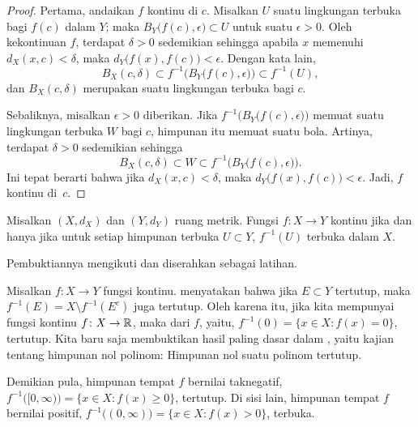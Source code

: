 \begin{proof}
Pertama, andaikan $f$ kontinu di $c$.
Misalkan $U$ suatu lingkungan terbuka bagi $f(c)$
dalam $Y$; maka $B_Y\bigl(f(c),\epsilon\bigr) \subset U$ untuk suatu $\epsilon >
0$.  Oleh kekontinuan $f$, terdapat $\delta > 0$
sedemikian sehingga apabila $x$ memenuhi $d_X(x,c) < \delta$, maka
$d_Y\bigl(f(x),f(c)\bigr) < \epsilon$.  Dengan kata lain,
\begin{equation*}
B_X(c,\delta) \subset f^{-1}\bigl(B_Y\bigl(f(c),\epsilon\bigr)\bigr) \subset
f^{-1}(U) ,
\end{equation*}
dan $B_X(c,\delta)$ merupakan suatu lingkungan terbuka bagi $c$.

Sebaliknya,
misalkan $\epsilon > 0$ diberikan.  Jika
$f^{-1}\bigl(B_Y\bigl(f(c),\epsilon\bigr)\bigr)$ memuat suatu
lingkungan terbuka $W$ bagi $c$, himpunan itu memuat suatu bola.  Artinya, terdapat $\delta > 0$
sedemikian sehingga
\begin{equation*}
B_X(c,\delta) \subset W \subset f^{-1}\bigl(B_Y\bigl(f(c),\epsilon\bigr)\bigr) .
\end{equation*}
Ini tepat berarti bahwa jika $d_X(x,c) < \delta$,
maka $d_Y\bigl(f(x),f(c)\bigr) < \epsilon$.
Jadi, $f$ kontinu di~$c$.
\end{proof}

\begin{thm} \label{thm:mstopocont}
Misalkan $(X,d_X)$ dan $(Y,d_Y)$ ruang metrik.  Fungsi $f \colon X \to Y$
kontinu jika dan hanya jika
untuk setiap himpunan terbuka $U \subset Y$, $f^{-1}(U)$ terbuka dalam $X$.
\end{thm}

Pembuktiannya mengikuti  dan diserahkan sebagai
latihan.

\begin{example}
Misalkan $f \colon X \to Y$ fungsi kontinu.
 menyatakan bahwa jika $E \subset Y$ tertutup, maka 
$f^{-1}(E) = X \setminus f^{-1}(E^c)$ juga tertutup.  Oleh karena itu, jika
kita mempunyai fungsi kontinu
$f \colon X \to {\mathbb{R}}$, maka
\emph{} dari $f$, yaitu, 
$f^{-1}(0) = \bigl\{ x \in X : f(x) = 0 \bigr\}$, tertutup.
Kita baru saja membuktikan hasil paling dasar dalam
\emph{}, yaitu kajian tentang
himpunan nol polinom: Himpunan nol suatu polinom tertutup.

Demikian pula, himpunan tempat $f$ bernilai taknegatif,
$f^{-1}\bigl( [0,\infty) \bigr) = \bigl\{ x \in X : f(x) \geq 0 \bigr\}$,
tertutup.  Di sisi lain,
himpunan tempat $f$ bernilai positif,
$f^{-1}\bigl( (0,\infty) \bigr) = \bigl\{ x \in X : f(x) > 0 \bigr\}$,
terbuka.  
\end{example}

